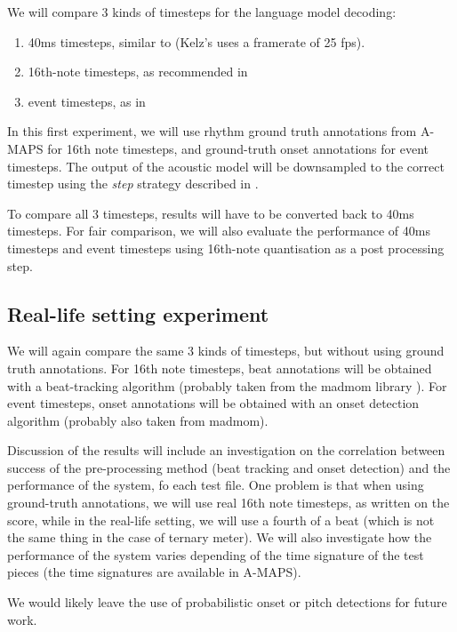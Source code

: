 \documentclass{article}
\begin{document}
We will compare 3 kinds of timesteps for the language model decoding:

\begin{enumerate}
\item 40ms timesteps, similar to \citep{sigtia2016end} (Kelz's uses a framerate of 25 fps).
\item 16th-note timesteps, as recommended in \citep{Ycart2017}
\item event timesteps, as in \citep{app8030470}
\end{enumerate}

In this first experiment, we will use rhythm ground truth annotations from A-MAPS for 16th note timesteps, and ground-truth onset annotations for event timesteps.
The output of the acoustic model will be downsampled to the correct timestep using the \emph{step}
strategy described in \citep{ycart2018polyphonic}.

To compare all 3 timesteps, results will have to be converted back to 40ms timesteps.
For fair comparison, we will also evaluate the performance of 40ms timesteps and event timesteps using 16th-note quantisation as a post processing step.

\subsection{Real-life setting experiment}

We will again compare the same 3 kinds of timesteps, but without using ground truth annotations.
For 16th note timesteps, beat annotations will be obtained with a beat-tracking algorithm (probably taken from the madmom library \citep{madmom}).
For event timesteps, onset annotations will be obtained with an onset detection algorithm (probably also taken from madmom).

Discussion of the results will include an investigation on the correlation between success of the pre-processing method (beat tracking and onset detection) and the performance of the system, fo each test file.
One problem is that when using ground-truth annotations, we will use real 16th note timesteps, as written on the score, while in the real-life setting, we will use a fourth of a beat (which is not the same thing in the case of ternary meter).
We will also investigate how the performance of the system varies depending of the time signature of the test pieces (the time signatures are available in A-MAPS).

We would likely leave the use of probabilistic onset or pitch detections for future work.
\end{document}
